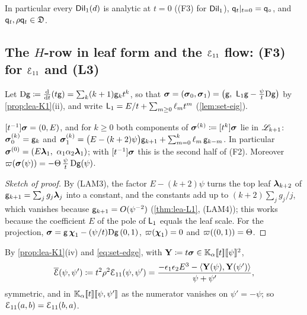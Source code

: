 In particular every $\mathsf{Dil}_1(d)$ is analytic at $t=0$ ((F3) for $\mathsf{Dil}_1$), $\mathsf{q}_{t}|_{t=0}=\mathsf{q}_{\circ}$, and $\mathsf{q}_{t},\rho\mathsf{q}_{t}\in\mathfrak{D}$.

\subsection{The \texorpdfstring{$H$}{H}-row in leaf form and the \texorpdfstring{$\mathcal{E}_{11}$}{E11} flow: (F3) for \texorpdfstring{$\mathcal{E}_{11}$}{E11} and (L3)}
\label{sec:lea-flow}

Let $\mathrm{D}\mathsf{g}\coloneqq\frac{\mathrm{d}}{\mathrm{d} t}(t\mathsf{g})=\sum_k(k+1)\mathsf{g}_kt^k$, so that $\brow=(\brow_0,\brow_1)=\big(\gl,\ \Lv_1\gl-\frac{\psi}{t}\Dg\big)$ by \cref{prop:lea-K1}(ii), and write $\mathsf{L}_1=E/t+\sum_{m\geq0}\ell_mt^m$ (\cref{lem:set-eig}).

\begin{prop}
\label{prop:lea-sigma}
$[t^{-1}]\boldsymbol{\sigma}=(0,E)$, and for $k\geq0$ both components of $\boldsymbol{\sigma}^{(k)}\coloneqq[t^k]\boldsymbol{\sigma}$ lie in $\mathscr{L}_{k+1}$: $\boldsymbol{\sigma}^{(k)}_0=\mathsf{g}_k$ and $\boldsymbol{\sigma}^{(k)}_1=\big(E-(k+2)\psi\big)\mathsf{g}_{k+1}+\sum_{m=0}^{k}\ell_m\,\mathsf{g}_{k-m}$. In particular $\brow^{(0)}=(E\lf_1,\ \alpha_1\alpha_2\lf_1)$; with $[t^{-1}]\boldsymbol{\sigma}$ this is the second half of (F2). Moreover $\varpi(\boldsymbol{\sigma}(\psi))=-\Theta\,\frac{\psi}{t}\,\mathrm{D}\mathsf{g}(\psi)$.
\end{prop}

\begin{proof}[Sketch of proof]
By (LAM3), the factor $E-(k+2)\psi$ turns the top leaf $\boldsymbol{\lambda}_{k+2}$ of $\mathsf{g}_{k+1}=\sum_jg_j\boldsymbol{\lambda}_j$ into a constant, and the constants add up to $(k+2)\sum_jg_j/j$, which vanishes because $\mathsf{g}_{k+1}=O(\psi^{-2})$ (\cref{thm:lea-L1}, (LAM4)); this works because the coefficient $E$ of the pole of $\mathsf{L}_1$ equals the leaf scale. For the projection, $\boldsymbol{\sigma}=\mathsf{g}\,\boldsymbol{\chi}_1-(\psi/t)\mathrm{D}\mathsf{g}\,(0,1)$, $\varpi(\boldsymbol{\chi}_1)=0$ and $\varpi((0,1))=\Theta$.
\end{proof}

By \cref{prop:lea-K1}(iv) and \eqref{eq:set-edge}, with $\mathbf{Y}\coloneqq t\boldsymbol{\sigma}\in\mathbb{K}_{\alpha}[\![ t ]\!][\![ \psi ]\!]^2$,
\[
\overline{\mathcal{E}}(\psi,\psi')\coloneqq t^2\rho^2\mathcal{E}_{11}(\psi,\psi')=\frac{-\epsilon_1\epsilon_2E^3-\langle\mathbf{Y}(\psi),\mathbf{Y}(\psi')\rangle}{\psi+\psi'} ,
\]
symmetric, and in $\mathbb{K}_{\alpha}[\![ t ]\!][\![ \psi,\psi' ]\!]$ as the numerator vanishes on $\psi'=-\psi$; so $\mathcal{E}_{11}(a,b)=\mathcal{E}_{11}(b,a)$.

